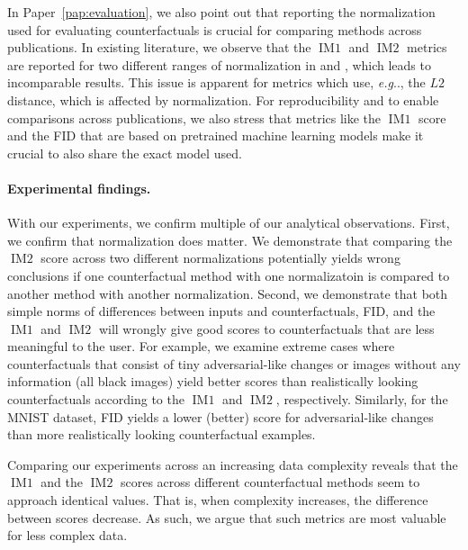 \documentclass[11pt,a4paper,twoside,openright,final]{memoir}
\makeatletter
\DeclareRobustCommand\onedot{\futurelet\@let@token\@onedot}
\def\@onedot{\ifx\@let@token.\else.\null\fi\xspace}
\def\eg{\emph{e.g}\onedot} \def\Eg{\emph{E.g}\onedot}
\newcommand*{\paperref}[1]{Paper~\hyperref[#1]{\ref{#1}}}
\makeatother
\begin{document}
In \paperref{pap:evaluation}, we also point out that reporting the normalization used for evaluating counterfactuals is crucial for comparing methods across publications.
In existing literature, we observe that the $\operatorname{IM1}$ and $\operatorname{IM2}$ metrics are reported for two different ranges of normalization in \cite{Mahajan2019} and \cite{VanLooveren2019}, which leads to incomparable results.
This issue is apparent for metrics which use, \eg, the $L2$ distance, which is affected by normalization.
For reproducibility and to enable comparisons across publications, we also stress that metrics like the $\operatorname{IM1}$ score and the FID that are based on pretrained machine learning models make it crucial to also share the exact model used.

\paragraph{Experimental findings.}
With our experiments, we confirm multiple of our analytical observations.
First, we confirm that normalization does matter.
We demonstrate that comparing the $\operatorname{IM2}$ score across two different normalizations potentially yields wrong conclusions if one counterfactual method with one normalizatoin is compared to another method with another normalization. 
Second, we demonstrate that both simple norms of differences between inputs and counterfactuals, FID, and the $\operatorname{IM1}$ and $\operatorname{IM2}$ will wrongly give good scores to counterfactuals that are less meaningful to the user.
For example, we examine extreme cases where counterfactuals that consist of tiny adversarial-like changes or images without any information (all black images) yield better scores than realistically looking counterfactuals according to the $\operatorname{IM1}$ and $\operatorname{IM2}$, respectively.
Similarly, for the MNIST dataset, FID yields a lower (better) score for adversarial-like changes than more realistically looking counterfactual examples.

Comparing our experiments across an increasing data complexity reveals that the $\operatorname{IM1}$ and the $\operatorname{IM2}$ scores across different counterfactual methods seem to approach identical values.
That is, when complexity increases, the difference between scores decrease.
As such, we argue that such metrics are most valuable for less complex data.
\end{document}
